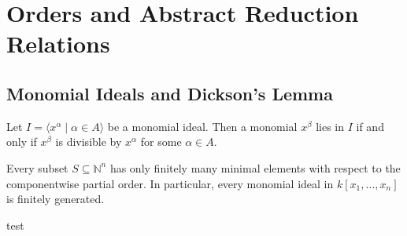 \chapter{Orders and Abstract Reduction Relations} 

\section{Monomial Ideals and Dickson’s Lemma}

\begin{lemma}\label{lem:monomial_ideal}
    Let $I = \langle x^\alpha \mid \alpha \in A \rangle$ be a monomial ideal.
    Then a monomial $x^\beta$ lies in $I$ if and only if $x^\beta$ is divisible by $x^\alpha$ for some $\alpha \in A$.
\end{lemma}

\begin{theorem}\label{thm:Dickson}
    Every subset $S\subseteq \mathbb{N}^n$ has only finitely many minimal elements with respect to the componentwise partial order. 
    In particular, every monomial ideal in $k[x_1,\dots,x_n]$ is finitely generated.
\end{theorem}

\begin{theorem}
    test
\end{theorem}